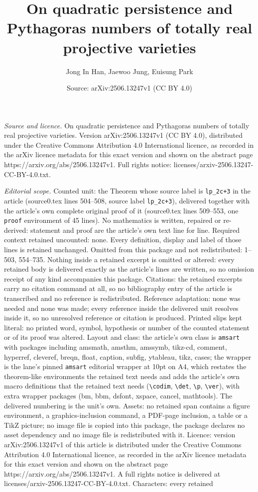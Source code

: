 \documentclass[10pt,a4paper]{amsart}
\title[On quadratic persistence and Pythagoras numbers of totally r]{On quadratic persistence and Pythagoras numbers of totally real projective varieties}
\author{Jong In Han, Jaewoo Jung, Euisung Park}
\date{Source: arXiv:2506.13247v1 (CC BY 4.0)}
\begin{document}
\maketitle

\noindent\emph{Source and licence.} On quadratic persistence and Pythagoras numbers of totally real projective varieties. Version arXiv:2506.13247v1 (CC BY 4.0), distributed under the Creative Commons Attribution 4.0 International licence, as recorded in the arXiv licence metadata for this exact version and shown on the abstract page https://arxiv.org/abs/2506.13247v1. Full rights notice: licenses/arxiv-2506.13247-CC-BY-4.0.txt.\par\smallskip

\noindent\textit{Editorial scope.} Counted unit: the Theorem whose source label is \texttt{lp\_2c+3} in the article (source0.tex lines 504--508, source label \texttt{lp\_2c+3}), delivered together with the article's own complete original proof of it (source0.tex lines 509--553, one \texttt{proof} environment of 45 lines). No mathematics is written, repaired or re-derived: statement and proof are the article's own text line for line. Required context retained uncounted: none. Every definition, display and label of those lines is retained unchanged. Omitted from this package and not redistributed: 1--503, 554--735. Nothing inside a retained excerpt is omitted or altered: every retained body is delivered exactly as the article's lines are written, so no omission receipt of any kind accompanies this package. Citations: the retained excerpts carry no citation command at all, so no bibliography entry of the article is transcribed and no reference is redistributed. Reference adaptation: none was needed and none was made; every reference inside the delivered unit resolves inside it, so no unresolved reference or citation is produced. Printed slips kept literal: no printed word, symbol, hypothesis or number of the counted statement or of its proof was altered. Layout and class: the article's own class is \texttt{amsart} with packages including amsmath, amsthm, amssymb, tikz-cd, comment, hyperref, cleveref, breqn, float, caption, subfig, ytableau, tikz, cases; the wrapper is the lane's pinned \texttt{amsart} editorial wrapper at 10pt on A4, which restates the theorem-like environments the retained text needs and adds the article's own macro definitions that the retained text needs (\texttt{\textbackslash codim}, \texttt{\textbackslash det}, \texttt{\textbackslash p}, \texttt{\textbackslash ver}), with extra wrapper packages (bm, bbm, dsfont, xspace, cancel, mathtools). The delivered numbering is the unit's own. Assets: no retained span contains a figure environment, a graphics-inclusion command, a PDF-page inclusion, a table or a TikZ picture; no image file is copied into this package, the package declares no asset dependency and no image file is redistributed with it. Licence: version arXiv:2506.13247v1 of this article is distributed under the Creative Commons Attribution 4.0 International licence, as recorded in the arXiv licence metadata for this exact version and shown on the abstract page https://arxiv.org/abs/2506.13247v1. A full rights notice is delivered at licenses/arxiv-2506.13247-CC-BY-4.0.txt. Characters: every retained 
\end{document}
